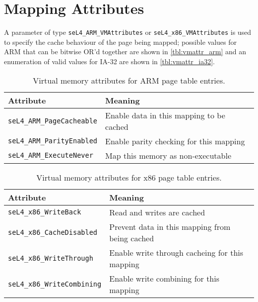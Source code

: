 \section{Mapping Attributes}
A parameter of type \texttt{seL4\_ARM\_VMAttributes} or
\texttt{seL4\_x86\_VMAttributes} is used to specify the cache behaviour of the
page being mapped; possible values for ARM that can be bitwise OR'd together are
shown in \autoref{tbl:vmattr_arm} \ifxeightsix and an enumeration of valid values
for IA-32 are shown in \autoref{tbl:vmattr_ia32}\fi.

\begin{table}[htb]
  \begin{center}
    \begin{tabularx}{\textwidth}{p{}X}
      \toprule
      Attribute & Meaning \\
      \midrule
      \texttt{seL4\_ARM\_PageCacheable} & Enable data in this mapping
      to be cached \\
      \texttt{seL4\_ARM\_ParityEnabled} & Enable parity checking for
      this mapping\\
      \texttt{seL4\_ARM\_ExecuteNever} & Map this memory as non-executable \\
      \bottomrule
    \end{tabularx}
    \caption{\label{tbl:vmattr_arm} Virtual memory attributes for ARM page
      table entries.}
  \end{center}
\end{table}

\begin{table}[htb]
  \begin{center}
    \begin{tabularx}{\textwidth}{p{}X}
      \toprule
      Attribute & Meaning \\
      \midrule
      \texttt{seL4\_x86\_WriteBack} & Read and writes are cached \\
      \texttt{seL4\_x86\_CacheDisabled} & Prevent data in this mapping
      from being cached \\
      \texttt{seL4\_x86\_WriteThrough} & Enable write through cacheing for this mapping \\
      \texttt{seL4\_x86\_WriteCombining} & Enable write combining for this mapping \\
      \bottomrule
    \end{tabularx}
    \caption{\label{tbl:vmattr_ia32} Virtual memory attributes for x86 page
      table entries.}
  \end{center}
\end{table}

